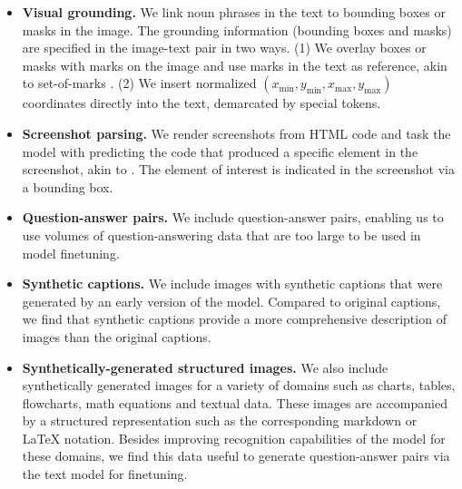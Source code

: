 \documentclass[dvipsnames]{fairmeta}
\begin{document}
\begin{itemize}

\item \textbf{Visual grounding.}
We link noun phrases in the text to bounding boxes or masks in the image.
The grounding information (bounding boxes and masks) are specified in the image-text pair in two ways. (1) We overlay boxes or masks with marks on the image and use marks in the text as reference, akin to set-of-marks \citep{yang2023set}. (2) We insert normalized $(x_\textrm{min}, y_\textrm{min}, x_\textrm{max}, y_\textrm{max})$ coordinates directly into the text, demarcated by special tokens.

\item \textbf{Screenshot parsing.} We render screenshots from HTML code and task the model with predicting the code that produced a specific element in the screenshot, akin to \citet{Pix2Struct}. The element of interest is indicated in the screenshot via a bounding box.

\item \textbf{Question-answer pairs.} We include question-answer pairs, enabling us to use volumes of question-answering data that are too large to be used in model finetuning.

\item \textbf{Synthetic captions.} We include images with synthetic captions that were generated by an early version of the model. Compared to original captions, we find that synthetic captions provide a more comprehensive description of images than the original captions.

\item \textbf{Synthetically-generated structured images.} We also include synthetically generated images for a variety of domains such as charts, tables, flowcharts, math equations and textual data. These images are accompanied by a structured representation such as the corresponding markdown or LaTeX notation. Besides improving recognition capabilities of the model for these domains, we find this data useful to generate question-answer pairs via the text model for finetuning.
\end{itemize}
\end{document}
